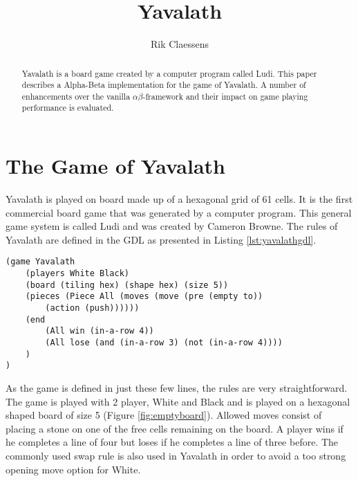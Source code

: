 \documentclass[11pt]{article}
\begin{document}
\title{{\Huge Yavalath} \\ \vspace{0.5em}{\large August 2014 - Intelligent Search \& Games\\ Master Artificial Intelligence, Maastricht University}}	
\author{Rik Claessens}

\maketitle

\begin{abstract}
Yavalath is a board game created by a computer program called Ludi. This paper describes a Alpha-Beta implementation for the game of Yavalath. A number of enhancements over the vanilla $\alpha \beta$-framework and their impact on game playing performance is evaluated.
\end{abstract}

\section{The Game of Yavalath}
\label{-sec:thegameofyavalath}
Yavalath is played on board made up of a hexagonal grid of 61 cells. It is the first commercial board game that was generated by a computer program. This general game system is called Ludi and was created by Cameron Browne. The rules of Yavalath are defined in the \ac{GDL} as presented in Listing \ref{lst:yavalathgdl}. 

\listingspace
\begin{lstlisting}[caption={The Yavalath definition in GDL}]
(game Yavalath 	
	(players White Black) 
	(board (tiling hex) (shape hex) (size 5)) 
	(pieces (Piece All (moves (move (pre (empty to)) 
		(action (push))))))  
	(end 
		(All win (in-a-row 4)) 
		(All lose (and (in-a-row 3) (not (in-a-row 4)))) 
	) 
)
\end{lstlisting}
\label{lst:yavalathgdl}
\listingspace

As the game is defined in just these few lines, the rules are very straightforward. The game is played with 2 player, White and Black and is played on a hexagonal shaped board of size 5 (Figure \ref{fig:emptyboard}). Allowed moves consist of placing a stone on one of the free cells remaining on the board. A player wins if he completes a line of four but loses if he completes a line of three before. The commonly used swap rule is also used in Yavalath in order to avoid a too strong opening move option for White. 
\end{document}
